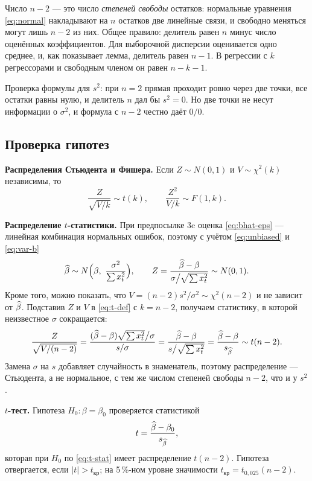 Число $n-2$ — это число \emph{степеней свободы} остатков: нормальные уравнения
\eqref{eq:normal} накладывают на $n$ остатков две линейные связи, и свободно
меняться могут лишь $n-2$ из них. Общее правило: делитель равен $n$ минус число
оценённых коэффициентов. Для выборочной дисперсии оценивается одно среднее, и,
как показывает лемма, делитель равен $n-1$. В регрессии с $k$ регрессорами и
свободным членом он равен $n-k-1$.

\begin{remark}
Проверка формулы для $s^2$: при $n=2$ прямая проходит ровно через две точки, все
остатки равны нулю, и делитель $n$ дал бы $s^2 = 0$. Но две точки не несут
информации о $\sigma^2$, и формула с $n-2$ честно даёт $0/0$.
\end{remark}

\subsection{Проверка гипотез}\label{sec:tests}

\textbf{Распределения Стьюдента и Фишера.} Если $Z \sim N(0,1)$ и
$V \sim \chi^2(k)$ независимы, то
\begin{equation}
  \frac{Z}{\sqrt{V/k}} \sim t(k),
  \qquad
  \frac{Z^2}{V/k} \sim F(1,k).
  \label{eq:t-def}
\end{equation}

\textbf{Распределение $t$-статистики.} При предпосылке 3c оценка
\eqref{eq:bhat-eps} — линейная комбинация нормальных ошибок, поэтому с учётом
\eqref{eq:unbiased} и \eqref{eq:var-b}
\[
  \bh \sim N\Bigl(\beta,\ \frac{\sigma^2}{\sum x_t^2}\Bigr),
  \qquad
  Z = \frac{\bh - \beta}{\sigma\big/\sqrt{\sum x_t^2}} \sim N(0,1).
\]
Кроме того, можно показать, что $V = (n-2)s^2/\sigma^2 \sim \chi^2(n-2)$ и не
зависит от $\widehat{\beta}$. Подставив $Z$ и $V$ в \eqref{eq:t-def} с $k = n-2$, получаем
статистику, в которой неизвестное $\sigma$ сокращается:
\begin{equation}
  \frac{Z}{\sqrt{V/(n-2)}}
  = \frac{(\widehat{\beta} - \beta)\sqrt{\sum x_t^2}\big/\sigma}{s/\sigma}
  = \frac{\widehat{\beta} - \beta}{s\big/\sqrt{\sum x_t^2}}
  = \frac{\widehat{\beta} - \beta}{s_{\widehat{\beta}}} \sim t(n-2).
  \label{eq:t-stat}
\end{equation}
Замена $\sigma$ на $s$ добавляет случайность в знаменатель, поэтому
распределение — Стьюдента, а не нормальное, с тем же числом степеней свободы
$n-2$, что и у $s^2$.

\textbf{$t$-тест.} Гипотеза $H_0\colon \beta = \beta_0$ проверяется статистикой
\begin{equation}
  t = \frac{\widehat{\beta} - \beta_0}{s_{\widehat{\beta}}},
  \label{eq:ttest}
\end{equation}
которая при $H_0$ по \eqref{eq:t-stat} имеет распределение $t(n-2)$. Гипотеза
отвергается, если $|t| > t_{\text{кр}}$; на 5\,\%-ном уровне значимости
$t_{\text{кр}} = t_{0{,}025}(n-2)$.

